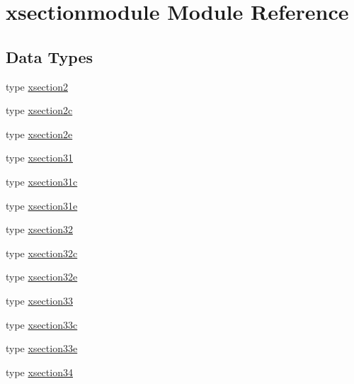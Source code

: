 \hypertarget{namespacexsectionmodule}{}\section{xsectionmodule Module Reference}
\label{namespacexsectionmodule}
\subsection*{Data Types}
\begin{DoxyCompactItemize}
\item 
type \hyperlink{structxsectionmodule_1_1xsection2}{xsection2}
\item 
type \hyperlink{structxsectionmodule_1_1xsection2c}{xsection2c}
\item 
type \hyperlink{structxsectionmodule_1_1xsection2e}{xsection2e}
\item 
type \hyperlink{structxsectionmodule_1_1xsection31}{xsection31}
\item 
type \hyperlink{structxsectionmodule_1_1xsection31c}{xsection31c}
\item 
type \hyperlink{structxsectionmodule_1_1xsection31e}{xsection31e}
\item 
type \hyperlink{structxsectionmodule_1_1xsection32}{xsection32}
\item 
type \hyperlink{structxsectionmodule_1_1xsection32c}{xsection32c}
\item 
type \hyperlink{structxsectionmodule_1_1xsection32e}{xsection32e}
\item 
type \hyperlink{structxsectionmodule_1_1xsection33}{xsection33}
\item 
type \hyperlink{structxsectionmodule_1_1xsection33c}{xsection33c}
\item 
type \hyperlink{structxsectionmodule_1_1xsection33e}{xsection33e}
\item 
type \hyperlink{structxsectionmodule_1_1xsection34}{xsection34}
\end{DoxyCompactItemize}
